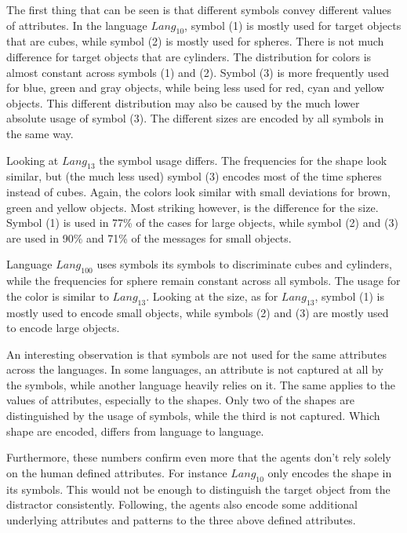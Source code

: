 The first thing that can be seen is that different symbols convey different values of attributes.
In the language $Lang_{10}$, symbol (1) is mostly used for target objects that are cubes, while symbol (2) is mostly used for spheres.
There is not much difference for target objects that are cylinders.
The distribution for colors is almost constant across symbols (1) and (2).
Symbol (3) is more frequently used for blue, green and gray objects, while being less used for red, cyan and yellow objects.
This different distribution may also be caused by the much lower absolute usage of symbol (3).
The different sizes are encoded by all symbols in the same way.

Looking at $Lang_{13}$ the symbol usage differs.
The frequencies for the shape look similar, but (the much less used) symbol (3) encodes most of the time spheres instead of cubes.
Again, the colors look similar with small deviations for brown, green and yellow objects.
Most striking however, is the difference for the size.
Symbol (1) is used in 77\% of the cases for large objects, while symbol (2) and (3) are used in 90\% and 71\% of the messages for small objects.

Language $Lang_{100}$ uses symbols its symbols to discriminate cubes and cylinders, while the frequencies for sphere remain constant across all symbols.
The usage for the color is similar to $Lang_{13}$.
Looking at the size, as for $Lang_{13}$, symbol (1) is mostly used to encode small objects, while symbols (2) and (3) are mostly used to encode large objects.

An interesting observation is that symbols are not used for the same attributes across the languages.
In some languages, an attribute is not captured at all by the symbols, while another language heavily relies on it.
The same applies to the values of attributes, especially to the shapes.
Only two of the shapes are distinguished by the usage of symbols, while the third is not captured.
Which shape are encoded, differs from language to language.

Furthermore, these numbers confirm even more that the agents don't rely solely on the human defined attributes.
For instance $Lang_{10}$ only encodes the shape in its symbols.
This would not be enough to distinguish the target object from the distractor consistently.
Following, the agents also encode some additional underlying attributes and patterns to the three above defined attributes.

